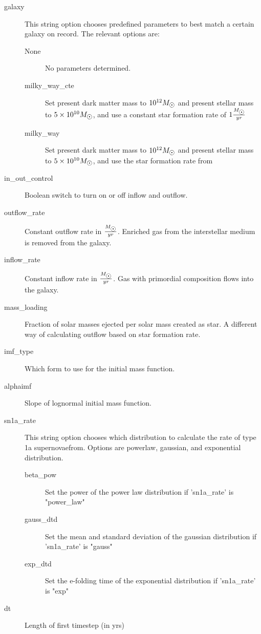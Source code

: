 \begin{description}
\item[galaxy]
  This string option chooses predefined parameters to best match a certain galaxy on record.
  The relevant options are:
  \begin{description}
  \item[None] No parameters determined.
  \item[milky\_way\_cte] Set present dark matter mass to $10^{12} \msol$ and present stellar mass to $5\times10^{10} \msol$, and use a constant star formation rate of $1 \frac{\msol}{yr}$
  \item[milky\_way] Set present dark matter mass to $10^{12} \msol$ and present stellar mass to $5\times10^{10} \msol$, and use the star formation rate from 
  \end{description}
\item[in\_out\_control] Boolean switch to turn on or off inflow and outflow.
\item[outflow\_rate]  Constant outflow rate in $\frac{\msol}{yr}$. Enriched gas from the interstellar medium is removed from the galaxy.
\item[inflow\_rate] Constant inflow rate in $\frac{\msol}{yr}$. Gas with primordial composition  flows into the galaxy.
\item[mass\_loading] Fraction of solar masses ejected per solar mass created as star. A different way of calculating outflow based on star formation rate.
\item[imf\_type] Which form to use for the initial mass function. 
\item[alphaimf] Slope of lognormal initial mass function. 
\item[sn1a\_rate] This string option chooses which distribution to calculate the rate of type 1a supernovaefrom.
  Options are powerlaw, gaussian, and exponential distribution.
  \begin{description}
  \item[beta\_pow] Set the power of the power law distribution if 'sn1a\_rate' is "power\_law" 
  \item[gauss\_dtd] Set the mean and standard deviation of the gaussian distribution if 'sn1a\_rate' is "gauss" 
  \item[exp\_dtd] Set the e-folding time of the exponential distribution if 'sn1a\_rate' is "exp"
  \end{description}
\item[dt] Length of first timestep (in yrs)

\end{description}
